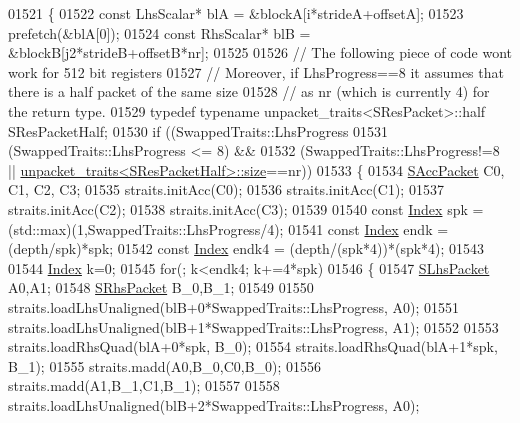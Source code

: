 \begin{DoxyCode}
01521         \{
01522           \textcolor{keyword}{const} LhsScalar* blA = &blockA[i*strideA+offsetA];
01523           prefetch(&blA[0]);
01524           \textcolor{keyword}{const} RhsScalar* blB = &blockB[j2*strideB+offsetB*nr];
01525 
01526           \textcolor{comment}{// The following piece of code wont work for 512 bit registers}
01527           \textcolor{comment}{// Moreover, if LhsProgress==8 it assumes that there is a half packet of the same size}
01528           \textcolor{comment}{// as nr (which is currently 4) for the return type.}
01529           \textcolor{keyword}{typedef} \textcolor{keyword}{typename} unpacket\_traits<SResPacket>::half SResPacketHalf;
01530           \textcolor{keywordflow}{if} ((SwappedTraits::LhsProgress %
01531               (SwappedTraits::LhsProgress <= 8) &&
01532               (SwappedTraits::LhsProgress!=8 || 
      \hyperlink{struct_eigen_1_1internal_1_1unpacket__traits}{unpacket\_traits<SResPacketHalf>::size}==nr))
01533           \{
01534             \hyperlink{class_eigen_1_1internal_1_1_tensor_lazy_evaluator_writable}{SAccPacket} C0, C1, C2, C3;
01535             straits.initAcc(C0);
01536             straits.initAcc(C1);
01537             straits.initAcc(C2);
01538             straits.initAcc(C3);
01539 
01540             \textcolor{keyword}{const} \hyperlink{namespace_eigen_a62e77e0933482dafde8fe197d9a2cfde}{Index} spk   = (std::max)(1,SwappedTraits::LhsProgress/4);
01541             \textcolor{keyword}{const} \hyperlink{namespace_eigen_a62e77e0933482dafde8fe197d9a2cfde}{Index} endk  = (depth/spk)*spk;
01542             \textcolor{keyword}{const} \hyperlink{namespace_eigen_a62e77e0933482dafde8fe197d9a2cfde}{Index} endk4 = (depth/(spk*4))*(spk*4);
01543 
01544             \hyperlink{namespace_eigen_a62e77e0933482dafde8fe197d9a2cfde}{Index} k=0;
01545             \textcolor{keywordflow}{for}(; k<endk4; k+=4*spk)
01546             \{
01547               \hyperlink{class_eigen_1_1internal_1_1_tensor_lazy_evaluator_writable}{SLhsPacket} A0,A1;
01548               \hyperlink{class_eigen_1_1internal_1_1_tensor_lazy_evaluator_writable}{SRhsPacket} B\_0,B\_1;
01549 
01550               straits.loadLhsUnaligned(blB+0*SwappedTraits::LhsProgress, A0);
01551               straits.loadLhsUnaligned(blB+1*SwappedTraits::LhsProgress, A1);
01552 
01553               straits.loadRhsQuad(blA+0*spk, B\_0);
01554               straits.loadRhsQuad(blA+1*spk, B\_1);
01555               straits.madd(A0,B\_0,C0,B\_0);
01556               straits.madd(A1,B\_1,C1,B\_1);
01557 
01558               straits.loadLhsUnaligned(blB+2*SwappedTraits::LhsProgress, A0);

\end{DoxyCode}
